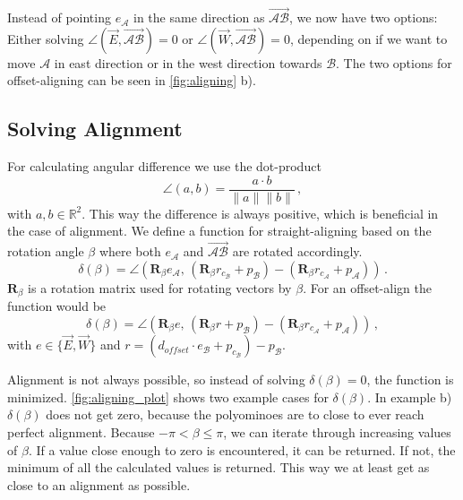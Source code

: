 Instead of pointing $e_\mathcal{A}$ in the same direction as $\overrightarrow{\mathcal{A}\mathcal{B}}$, we now have two options:
Either solving $\angle \left( \vec{E}, \overrightarrow{\mathcal{A}\mathcal{B}} \right) = 0$ or $\angle \left( \vec{W}, \overrightarrow{\mathcal{A}\mathcal{B}} \right) = 0$, depending on if we want to move $\mathcal{A}$ in east direction or in the west direction towards $\mathcal{B}$.
The two options for offset-aligning can be seen in \autoref{fig:aligning} b).

\subsection{Solving Alignment}

For calculating angular difference we use the dot-product
\begin{equation*}
\angle (a,b) = \frac{a \cdot b}{\lVert a \rVert \lVert b \rVert} \,,
\end{equation*}
with $a,b \in \mathbb{R}^2$. This way the difference is always positive, which is beneficial in the case of alignment.
We define a function for straight-aligning based on the rotation angle $\beta$ where both $e_\mathcal{A}$ and $\overrightarrow{\mathcal{A}\mathcal{B}}$ are rotated accordingly.
\begin{equation}
\delta(\beta) = \angle \left( \mathbf{R}_\beta e_\mathcal{A}, \, \left( \mathbf{R}_\beta r_{c_\mathcal{B}} + p_\mathcal{B} \right) - \left( \mathbf{R}_\beta r_{c_\mathcal{A}} + p_\mathcal{A} \right)\right) \,.
\end{equation}
$\mathbf{R}_\beta$ is a rotation matrix used for rotating vectors by $\beta$.
For an offset-align the function would be
\begin{equation}
\delta(\beta) = \angle \left( \mathbf{R}_\beta e, \, \left( \mathbf{R}_\beta r + p_\mathcal{B} \right) - \left( \mathbf{R}_\beta r_{c_\mathcal{A}} + p_\mathcal{A} \right)\right) \,,
\end{equation}
with $e \in \{ \vec{E}, \vec{W}\}$ and $r = \left( d_\textit{offset} \cdot e_\mathcal{B} + p_{c_\mathcal{B}} \right) - p_\mathcal{B}$.

Alignment is not always possible, so instead of solving $\delta(\beta) = 0$, the function is minimized.
\autoref{fig:aligning_plot} shows two example cases for $\delta(\beta)$.
In example b) $\delta(\beta)$ does not get zero, because the polyominoes are to close to ever reach perfect alignment.
Because $-\pi < \beta \leq \pi$, we can iterate through increasing values of $\beta$.
If a value close enough to zero is encountered, it can be returned.
If not, the minimum of all the calculated values is returned.
This way we at least get as close to an alignment as possible.


